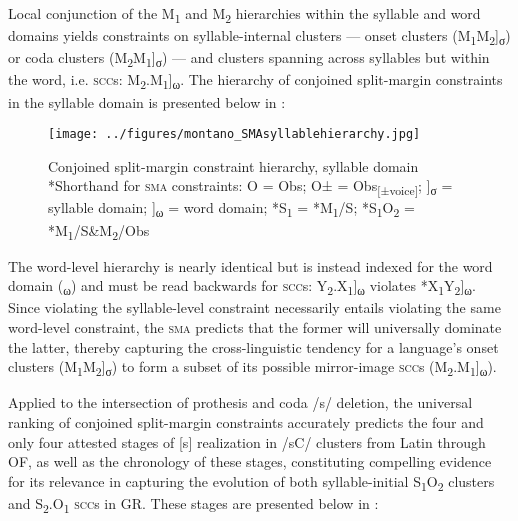 \documentclass[output=paper,colorlinks,citecolor=brown,
]{langscibook}
\begin{document}
Local conjunction of the M\textsubscript{1} and M\textsubscript{2} hierarchies within the syllable and word domains yields constraints on syllable-internal clusters — onset clusters (M\textsubscript{1}M\textsubscript{2}]\textsubscript{σ}) or coda clusters (M\textsubscript{2}M\textsubscript{1}]\textsubscript{σ}) — and clusters spanning across syllables but within the word, i.e. \textsc{scc}s: M\textsubscript{2}.M\textsubscript{1}]\textsubscript{ω}.  The hierarchy of conjoined split-margin constraints in the syllable domain is presented below in :

\begin{figure}
    \texttt{[image: ../figures/montano\_SMAsyllablehierarchy.jpg]} %
    \caption{Conjoined split-margin constraint hierarchy, syllable domain\\ *Shorthand for \textsc{sma} constraints: O = Obs; O± = Obs\textsubscript{[±voice]}; ]\textsubscript{σ} = syllable domain; ]\textsubscript{ω} = word domain; *S\textsubscript{1} = *M\textsubscript{1}/S; *S\textsubscript{1}O\textsubscript{2} =  *M\textsubscript{1}/S\&M\textsubscript{2}/Obs}
    \label{fig:montano:SMAsyllablehierarchy}
\end{figure}

\noindent The word-level hierarchy is nearly identical but is instead indexed for the word domain (\textsubscript{ω}) and must be read backwards for \textsc{scc}s: Y\textsubscript{2}.X\textsubscript{1}]\textsubscript{ω} violates *X\textsubscript{1}Y\textsubscript{2}]\textsubscript{ω}.  Since violating the syllable-level constraint necessarily entails violating the same word-level constraint, the \textsc{sma} predicts that the former will universally dominate the latter, thereby capturing the cross-linguistic tendency for a language's onset clusters (M\textsubscript{1}M\textsubscript{2}]\textsubscript{σ}) to form a subset of its possible mirror-image \textsc{scc}s (M\textsubscript{2}.M\textsubscript{1}]\textsubscript{ω}).

Applied to the intersection of prothesis and coda /s/ deletion, the universal ranking of conjoined split-margin constraints accurately predicts the four and only four attested stages of [s] realization in /sC/ clusters from Latin through OF, as well as the chronology of these stages, constituting compelling evidence for its relevance in capturing the evolution of both syllable-initial S\textsubscript{1}O\textsubscript{2} clusters and S\textsubscript{2}.O\textsubscript{1} \textsc{scc}s in GR.  These stages are presented below in :
\end{document}
